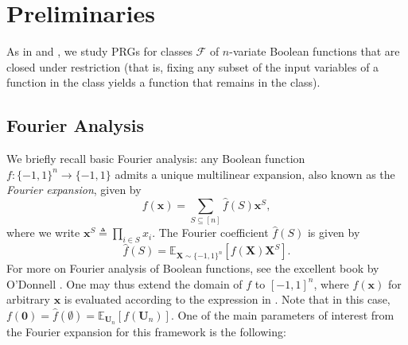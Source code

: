 \documentclass[10pt,a4paper]{article}
\theoremstyle{definition}
\begin{document}
\section{Preliminaries}
\label{sec:preliminaries}
As in \cite{CHHL} and \cite{CHLT}, we study PRGs for classes $\mathcal{F}$ of $n$-variate Boolean functions that are closed under restriction (that is, fixing any subset of the input variables of a function in the class yields a function that remains in the class). 














































\subsection{Fourier Analysis} \label{subsec:fourier}
We briefly recall basic Fourier analysis: any Boolean function $f:\{-1,1\}^n \to \{-1,1\}$ admits a unique multilinear expansion, also known as the \emph{Fourier expansion}, given by 
\begin{equation}
\label{eq:fourierexpansion}
    f(\mathbf{x})=\sum_{S\subseteq [n]} \hat{f}(S)\mathbf{x}^S,
\end{equation}
where we write $\mathbf{x}^S\triangleq \prod_{i\in S} x_i$. The   Fourier coefficient $\hat{f}(S)$ is given by
\begin{equation*}
    \hat{f}(S)=\mathbb{E}_{\mathbf{X}\sim \{-1,1\}^n}[f(\mathbf{X})\mathbf{X}^S].
\end{equation*}
For more on Fourier analysis of Boolean functions, see the excellent book by O'Donnell \cite{ODonnelBook}. One may thus extend the domain of $f$ to $[-1,1]^n$, where $f(\mathbf{x})$ for arbitrary $\mathbf{x}$ is evaluated according to the expression in . Note that in this case, $f(\mathbf{0})=\hat{f}(\emptyset)=\mathbb{E}_{\mathbf{U}_n}[f(\mathbf{U}_n)]$. One of the main parameters of interest from the Fourier expansion for this framework is the following:
\end{document}
